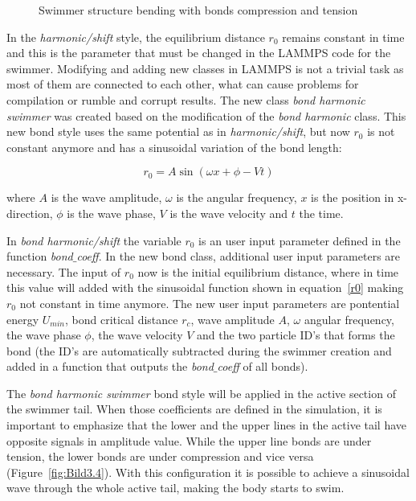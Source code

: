 \begin{figure}[H]
\centering
  \begin{footnotesize}
  
  \caption[Swimmer structure bending with bonds compression and tension]{Swimmer structure bending with bonds compression and tension}
  \label{fig:Bild3.3}
  \end{footnotesize}
\end{figure} 

In the \textit{harmonic/shift} style, the equilibrium distance $r_{0}$ remains constant in time and this is the parameter that must be changed in the LAMMPS code for the swimmer. Modifying and
adding new classes in LAMMPS is not a trivial task as most of them are connected to each other, what can cause problems for compilation or rumble and corrupt results. The new class
\textit{bond harmonic swimmer} was created based on the modification of the \textit{bond harmonic} class. This new  bond style uses the same potential as in \textit{harmonic/shift}, but now $r_{0}$
is not constant anymore and has a sinusoidal variation of the bond length:

\begin{equation}\label{r0}
  r_{0} = A  \sin (\omega x + \phi - Vt)
\end{equation}

where $A$ is the wave amplitude, $\omega$ is the angular frequency, $x$ is the position in x-direction, $\phi$ is the wave phase, $V$ is the wave velocity and $t$ the time.\par
In \textit{bond harmonic/shift} the variable $r_{0}$ is an user input parameter defined in the function \textit{bond$\_$coeff}. In the new bond class, additional user input parameters are 
necessary. The input of $r_{0}$ now is the initial equilibrium distance, where in time this value will added with the sinusoidal function shown in equation~\ref{r0} making $r_{0}$
not constant in time anymore. The new user input parameters are pontential energy $U_{min}$, bond critical distance $r_{c}$, wave amplitude $A$, $\omega$ angular frequency,
the wave phase $\phi$, the wave velocity $V$ and the two particle ID's that forms the bond (the ID's are automatically subtracted during the swimmer creation and added in a function
that outputs the \textit{bond$\_$coeff} of all bonds).\par
The \textit{bond harmonic swimmer} bond style will be applied in the  active section of the swimmer tail. When those coefficients are defined in the simulation, it is important to
emphasize that the lower and the upper lines in the active tail have opposite signals in amplitude value. While the upper line bonds are under tension, the lower bonds are under 
compression and vice versa (Figure~\ref{fig:Bild3.4}). With this configuration it is possible to achieve a sinusoidal wave through the whole active tail, making the body starts to swim.


